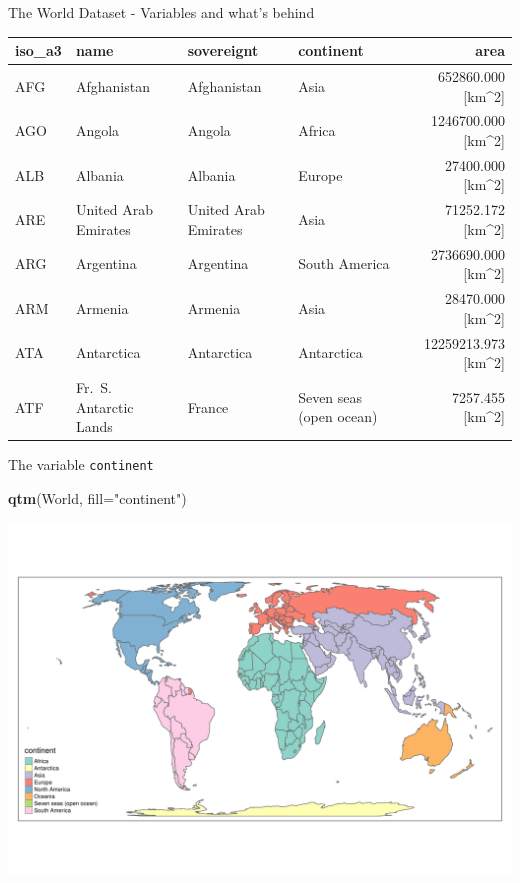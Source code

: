 \documentclass[
  ignorenonframetext,
]{beamer}
\newenvironment{Shaded}{\begin{snugshade}}{\end{snugshade}}
\newcommand{\DataTypeTok}[1]{\textcolor[rgb]{0.13,0.29,0.53}{#1}}
\newcommand{\KeywordTok}[1]{\textcolor[rgb]{0.13,0.29,0.53}{\textbf{#1}}}
\newcommand{\NormalTok}[1]{#1}
\newcommand{\StringTok}[1]{\textcolor[rgb]{0.31,0.60,0.02}{#1}}
\begin{document}
\begin{frame}{The World Dataset - Variables and what's behind}
\protect\hypertarget{the-world-dataset---variables-and-whats-behind}{}
\begin{longtable}[]{@{}llllr@{}}
\toprule
iso\_a3 & name & sovereignt & continent & area\tabularnewline
\midrule
\endhead
AFG & Afghanistan & Afghanistan & Asia & 652860.000
{[}km\^{}2{]}\tabularnewline
AGO & Angola & Angola & Africa & 1246700.000
{[}km\^{}2{]}\tabularnewline
ALB & Albania & Albania & Europe & 27400.000
{[}km\^{}2{]}\tabularnewline
ARE & United Arab Emirates & United Arab Emirates & Asia & 71252.172
{[}km\^{}2{]}\tabularnewline
ARG & Argentina & Argentina & South America & 2736690.000
{[}km\^{}2{]}\tabularnewline
ARM & Armenia & Armenia & Asia & 28470.000 {[}km\^{}2{]}\tabularnewline
ATA & Antarctica & Antarctica & Antarctica & 12259213.973
{[}km\^{}2{]}\tabularnewline
ATF & Fr.~S. Antarctic Lands & France & Seven seas (open ocean) &
7257.455 {[}km\^{}2{]}\tabularnewline
\bottomrule
\end{longtable}
\end{frame}

\begin{frame}[fragile]{The variable \texttt{continent}}
\protect\hypertarget{the-variable-continent}{}
\begin{Shaded}
\begin{Highlighting}[]
\KeywordTok{qtm}\NormalTok{(World, }\DataTypeTok{fill=}\StringTok{"continent"}\NormalTok{)}
\end{Highlighting}
\end{Shaded}

\includegraphics{quick_high_quality_maps_files/figure-beamer/unnamed-chunk-8-1.pdf}
\end{frame}
\end{document}
